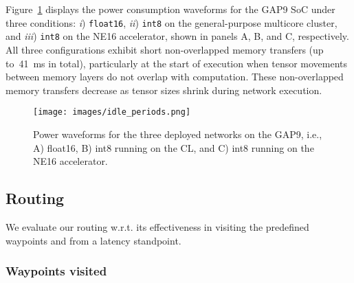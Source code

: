 Figure~\ref{fig:powerGAP9} displays the power consumption waveforms for the GAP9 SoC under three conditions: \textit{i}) \texttt{float16}, \textit{ii}) \texttt{int8} on the general-purpose multicore cluster, and \textit{iii}) \texttt{int8} on the NE16 accelerator, shown in panels A, B, and C, respectively. 
All three configurations exhibit short non-overlapped memory transfers (up to~\SI{41}{\milli\second} in total), particularly at the start of execution when tensor movements between memory layers do not overlap with computation. 
These non-overlapped memory transfers decrease as tensor sizes shrink during network execution.

\begin{figure}{}
\centering
\texttt{[image: images/idle\_periods.png]}
\caption{Power waveforms for the three deployed networks on the GAP9, i.e., A) float16, B) int8 running on the CL, and C) int8 running on the NE16 accelerator.}
\label{fig:powerGAP9}
\end{figure}


\subsection{Routing}

We evaluate our routing w.r.t. its effectiveness in visiting the predefined waypoints and from a latency standpoint.


\subsubsection{Waypoints visited}

